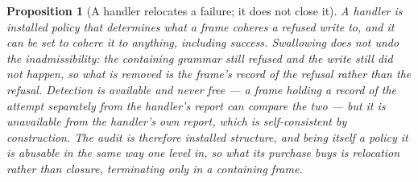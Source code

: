 \documentclass[11pt,a4paper]{article}
\newtheorem{proposition}[definition]{Proposition}
\theoremstyle{remark}\newtheorem{remark}[definition]{Remark}
\begin{document}
\begin{proposition}[A handler relocates a failure; it does not close it]\label{prop:handler-relocates}
A handler is installed policy that determines what a frame coheres a refused write to, and it can be
set to cohere it to anything, including success. Swallowing does not undo the inadmissibility: the
containing grammar still refused and the write still did not happen, so what is removed is the frame's
\emph{record} of the refusal rather than the refusal. Detection is available and never free --- a frame
holding a record of the attempt separately from the handler's report can compare the two --- but it is
unavailable from the handler's own report, which is self-consistent by construction. The audit is
therefore installed structure, and being itself a policy it is abusable in the same way one level in,
so what its purchase buys is relocation rather than closure, terminating only in a containing frame.
\end{proposition}
\end{document}
